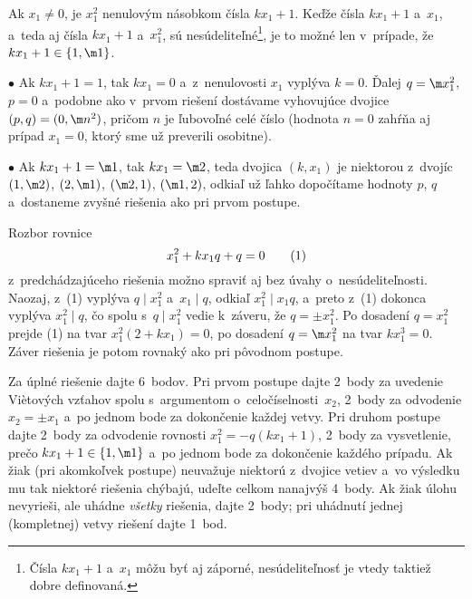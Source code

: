{Ak $x_1\ne0$, je $x_1^2$ nenulovým násobkom čísla $kx_1+1$. Keďže čísla $kx_1+1$ a~$x_1$, a~teda aj čísla $kx_1+1$ a~$x_1^2$, sú nesúdeliteľné\footnote{Čísla $kx_1+1$ a~$x_1$ môžu byť aj záporné, nesúdeliteľnosť je vtedy taktiež dobre definovaná.}, je to možné len v~prípade, že $kx_1+1\in\{1,\m1\}$.
\item{$\bullet$} Ak $kx_1+1=1$, tak $kx_1=0$ a~z~nenulovosti $x_1$ vyplýva $k=0$. Ďalej $q=\m x_1^2$, $p=0$ a~podobne ako v~prvom riešení dostávame vyhovujúce dvojice $(p,q)=(0,\m n^2)$, pričom $n$ je ľubovoľné celé číslo (hodnota $n=0$ zahŕňa aj  prípad $x_1=0$, ktorý sme už preverili osobitne).
\item{$\bullet$} Ak $kx_1+1=\m1$, tak $kx_1=\m2$, teda dvojica $(k,x_1)$ je niektorou z~dvojíc $(1,\m2)$, $(2,\m1)$, $(\m2,1)$, $(\m1,2)$, odkiaľ už ľahko dopočítame hodnoty $p$, $q$ a~dostaneme zvyšné riešenia ako pri prvom postupe.

\poznamka
Rozbor rovnice
$$
x_1^2+kx_1q+q=0
\tag1
$$
z~predchádzajúceho riešenia možno spraviť aj bez úvahy o~nesúdeliteľnosti.
Naozaj, z~(1) vyplýva $q\mid x_1^2$ a~$x_1\mid q$, odkiaľ $x_1^2\mid x_1q$, a~preto z~(1) dokonca vyplýva $x_1^2\mid q$, čo spolu
s~$q\mid x_1^2$ vedie k~záveru, že $q=\pm x_1^2$. Po dosadení
$q=x_1^2$ prejde (1) na tvar $x_1^2(2+kx_1)=0$, po dosadení
$q=\m x_1^2$ na tvar $kx_1^3=0$. Záver riešenia je potom rovnaký ako
pri pôvodnom postupe.

\nobreak\medskip\petit\noindent
Za úplné riešenie dajte 6~bodov. Pri prvom postupe dajte 2~body za uvedenie Vi\`etových vzťahov spolu s~argumentom o~celočíselnosti~$x_2$, 2~body za odvodenie $x_2=\pm x_1$ a~po jednom bode za dokončenie každej vetvy. Pri druhom postupe dajte 2~body za odvodenie rovnosti $x_1^2=-q(kx_1+1)$, 2~body za vysvetlenie, prečo $kx_1+1\in\{1,\m1\}$ a~po jednom bode za dokončenie každého prípadu. Ak žiak (pri akomkoľvek postupe) neuvažuje niektorú z~dvojice vetiev a~vo výsledku mu tak niektoré riešenia chýbajú, udeľte celkom nanajvýš 4~body. Ak žiak úlohu nevyrieši, ale uhádne {\it všetky} riešenia, dajte 2~body; pri uhádnutí jednej (kompletnej) vetvy riešení dajte 1~bod.

\endpetit
\bigbreak
}


